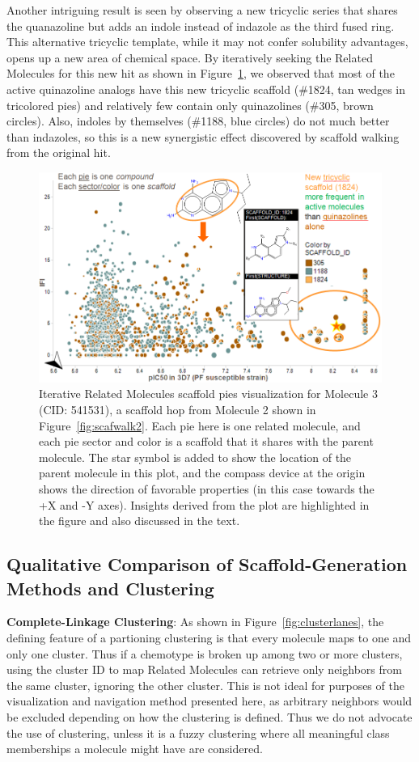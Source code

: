 \documentclass[journal=jacsat,manuscript=article]{achemso}
\newcommand*\fref[1]{Figure~\ref{fig:#1}}
\begin{document}
Another intriguing result is seen by observing a new tricyclic series that shares the quanazoline but adds an indole instead of indazole as the third fused ring. This alternative tricyclic template, while it may not confer solubility advantages, opens up a new area of chemical space. By iteratively seeking the Related Molecules for this new hit as shown in \fref{scafwalk3}, we observed that most of the active quinazoline analogs have this new tricyclic scaffold (\#1824, tan wedges in tricolored pies) and relatively few contain only quinazolines (\#305, brown circles). Also, indoles by themselves (\#1188, blue circles) do not much better than indazoles, so this is a new synergistic effect discovered by scaffold walking from the original hit.            

\begin{figure}
\includegraphics[width=6in]{fig/mol3_RGtool_scafpie_iter.png}
\caption{Iterative Related Molecules scaffold pies visualization for Molecule 3 (CID: 541531), a scaffold hop from Molecule 2 shown in \fref{scafwalk2}. Each pie here is one related molecule, and each pie sector and color is a scaffold that it shares with the parent molecule. The star symbol is added to show the location of the parent molecule in this plot, and the compass device at the origin shows the direction of favorable properties (in this case towards the +X and -Y axes). Insights derived from the plot are highlighted in the figure and also discussed in the text.}
\label{fig:scafwalk3}
\end{figure}

\subsection{Qualitative Comparison of Scaffold-Generation Methods and Clustering}
{\bf Complete-Linkage Clustering}: As shown in \fref{clusterlanes}, the defining feature of a partioning clustering is that every molecule maps to one and only one cluster. Thus if a chemotype is broken up among two or more clusters, using the cluster ID to map Related Molecules can retrieve only neighbors from the same cluster, ignoring the other cluster. This is not ideal for purposes of the visualization and navigation method presented here, as arbitrary neighbors would be excluded depending on how the clustering is defined.  Thus we do not advocate the use of clustering, unless it is a fuzzy clustering where all meaningful class memberships a molecule might have are considered. 
\end{document}
